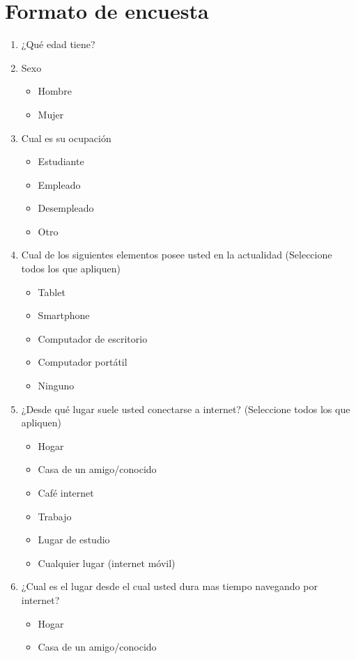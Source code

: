 \section{Formato de encuesta}

\begin{enumerate}
  \item ¿Qué edad tiene?
  \item Sexo
  \begin{itemize}
    \item Hombre
    \item Mujer
  \end{itemize}
  \item Cual es su ocupación
  \begin{itemize}
    \item Estudiante
    \item Empleado
    \item Desempleado
    \item Otro
  \end{itemize}
  \item Cual de los siguientes elementos posee usted en la actualidad (Seleccione todos los que apliquen)
  \begin{itemize}
    \item Tablet
    \item Smartphone
    \item Computador de escritorio
    \item Computador portátil
    \item Ninguno
  \end{itemize}
  \item ¿Desde qué lugar suele usted conectarse a internet? (Seleccione todos los que apliquen)
  \begin{itemize}
    \item Hogar
    \item Casa de un amigo/conocido
    \item Café internet
    \item Trabajo
    \item Lugar de estudio
    \item Cualquier lugar (internet móvil)
  \end{itemize}
  \item ¿Cual es el lugar desde el cual usted dura mas tiempo navegando por internet?
  \begin{itemize}
    \item Hogar
    \item Casa de un amigo/conocido

\end{itemize}
\end{enumerate}

